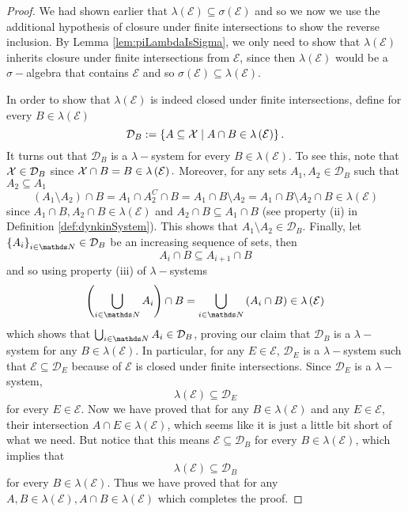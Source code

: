 \begin{proof}
We had shown earlier that $\lambda\left(\mathcal{E}\right)\subseteq\sigma\left(\mathcal{E}\right)$
and so we now we use the additional hypothesis of closure under finite
intersections to show the reverse inclusion. By Lemma \ref{lem:piLambdaIsSigma},
we only need to show that $\lambda\left(\mathcal{E}\right)$ inherits
closure under finite intersections from $\mathcal{E}$, since then
$\lambda\left(\mathcal{E}\right)$ would be a $\sigma-$algebra that
contains $\mathcal{E}$ and so $\sigma\left(\mathcal{E}\right)\subseteq\lambda\left(\mathcal{E}\right)$.

In order to show that $\lambda\left(\mathcal{E}\right)$ is indeed
closed under finite intersections, define for every $B\in\lambda\left(\mathcal{E}\right)$
\[
\mathcal{D}_{B}:=\left\{ A\subseteq\mathcal{X}\mid A\cap B\in\lambda\left(\mathcal{E}\right)\right\} .
\]
It turns out that $\mathcal{D}_{B}$ is a $\lambda-$system for every
$B\in\lambda\left(\mathcal{E}\right)$. To see this, note that $\mathcal{X}\in\mathcal{D}_{B}$
since $\mathcal{X}\cap B=B\in\lambda\left(\mathcal{E}\right).$ Moreover, for
any sets $A_{1},A_{2}\in\mathcal{D}_{B}$ such that $A_{2}\subseteq A_{1}$
\[
\left(A_{1}\setminus A_{2}\right)\cap B=A_{1}\cap A_{2}^{C}\cap B=A_{1}\cap B\setminus A_{2}=A_{1}\cap B\setminus A_{2}\cap B\in\lambda\left(\mathcal{E}\right)
\]
 since $A_{1}\cap B,A_{2}\cap B\in\lambda\left(\mathcal{E}\right)$
and $A_{2}\cap B\subseteq A_{1}\cap B$ (see property (ii) in Definition
\ref{def:dynkinSystem}). This shows that $A_{1}\setminus A_{2}\in\mathcal{D}_{B}.$
Finally, let $\left\{ A_{i}\right\} _{i\in\N}\in\mathcal{D}_{B}$
be an increasing sequence of sets, then
\[
A_{i}\cap B\subseteq A_{i+1}\cap B
\]
and so using property (iii) of $\lambda-$systems 
\[
\left(\bigcup_{i\in\N}A_{i}\right)\cap B=\bigcup_{i\in\N}\left(A_{i}\cap B\right)\in\lambda\left(\mathcal{E}\right)
\]
which shows that $\bigcup_{i\in\N}A_{i}\in\mathcal{D}_{B}$, proving
our claim that $\mathcal{D}_{B}$ is a $\lambda-$system for any $B\in\lambda\left(\mathcal{E}\right).$
In particular, for any $E\in\mathcal{E}$, $\mathcal{D}_{E}$ is a
$\lambda-$system such that $\mathcal{E}\subseteq\mathcal{D}_{E}$
because of $\mathcal{E}$ is closed under finite intersections. Since
$\mathcal{D}_{E}$ is a $\lambda-$system,
\[
\lambda\left(\mathcal{E}\right)\subseteq\mathcal{D}_{E}
\]
for every $E\in\mathcal{E}$. Now we have proved that for any $B\in\lambda\left(\mathcal{E}\right)$
and any $E\in\mathcal{E}$, their intersection $A\cap E\in\lambda\left(\mathcal{E}\right)$,
which seems like it is just a little bit short of what we need. But
notice that this means $\mathcal{E}\subseteq\mathcal{D}_{B}$ for
every $B\in\lambda\left(\mathcal{E}\right)$, which implies that 
\[
\lambda\left(\mathcal{E}\right)\subseteq\mathcal{D}_{B}
\]
for every $B\in\lambda\left(\mathcal{E}\right).$ Thus we have proved
that for any $A,B\in\mathcal{\lambda\left(E\right)},A\cap B\in\mathcal{\lambda\left(E\right)}$
which completes the proof.
\end{proof}
